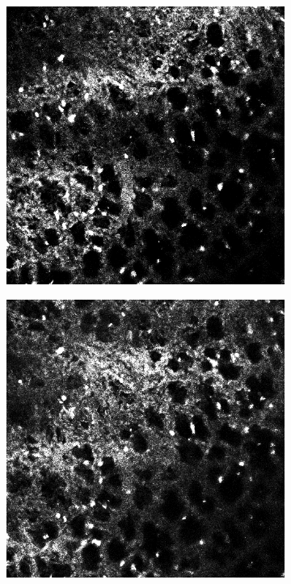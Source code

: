 	\begin{figure}[h]
	
		\begin{subfigure}{.32\textwidth}
		\includegraphics[width=\textwidth]{images/shutterseriesm170_13cropped001}
		\end{subfigure}%
		\hfill
		\begin{subfigure}{.32\textwidth}
		\includegraphics[width=\textwidth]{images/shutterseriesm170_13cropped002}

\end{subfigure}
\end{figure}
